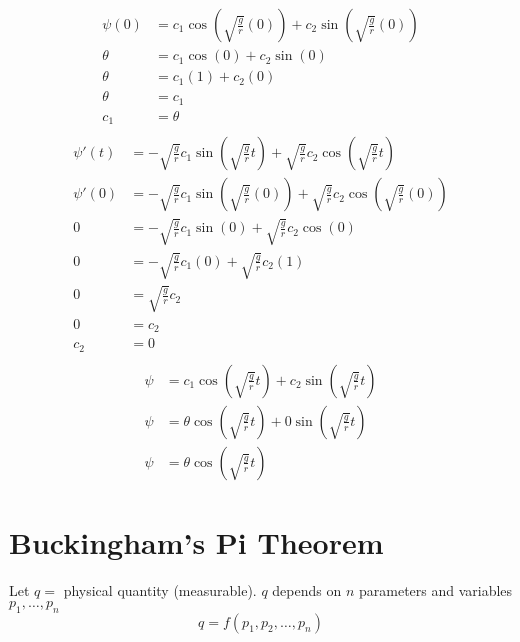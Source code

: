 \documentclass[
	date={August 26{,} 2024}
]{math486notes}
\begin{document}
\begin{example}
\begin{equation*}
\begin{aligned}
		\psi(0) &= c_{1}\cos\left( \sqrt{\frac{g}{r}}(0) \right) + c_{2}\sin\left( \sqrt{\frac{g}{r}}(0) \right)\\
		\theta &= c_{1}\cos\left( 0 \right) + c_{2}\sin\left( 0 \right)\\
		\theta &= c_{1}(1) + c_{2}(0)\\
		\theta &= c_{1}\\
		c_{1} &= \theta\\
	\end{aligned}
	\end{equation*}
	\begin{equation*}
	\begin{aligned}
		\psi'(t) &= -\sqrt{\frac{g}{r}}c_{1}\sin\left( \sqrt{\frac{g}{r}}t \right) + \sqrt{\frac{g}{r}}c_{2}\cos\left( \sqrt{\frac{g}{r}}t \right)\\
		\psi'(0) &= -\sqrt{\frac{g}{r}}c_{1}\sin\left( \sqrt{\frac{g}{r}}(0) \right) + \sqrt{\frac{g}{r}}c_{2}\cos\left( \sqrt{\frac{g}{r}}(0) \right)\\
		0 &= -\sqrt{\frac{g}{r}}c_{1}\sin(0) + \sqrt{\frac{g}{r}}c_{2}\cos(0)\\
		0 &= -\sqrt{\frac{g}{r}}c_{1}(0) + \sqrt{\frac{g}{r}}c_{2}(1)\\
		0 &= \sqrt{\frac{g}{r}}c_{2}\\
		0 &= c_{2}\\
		c_{2} &= 0\\
	\end{aligned}
	\end{equation*}
	\begin{equation*}
	\begin{aligned}
		\psi &= c_{1}\cos\left( \sqrt{\frac{g}{r}}t \right) + c_{2}\sin\left( \sqrt{\frac{g}{r}}t \right)\\
		\psi &= \theta\cos\left( \sqrt{\frac{g}{r}}t \right) + 0\sin\left( \sqrt{\frac{g}{r}}t \right)\\
		\psi &= \theta\cos\left( \sqrt{\frac{g}{r}}t \right)
	\end{aligned}
	\end{equation*} %
\end{example}

\section{Buckingham's Pi Theorem}\label{sec:buckingham's-pi-theorem}
Let $q=$ physical quantity (measurable).
$q$ depends on $n$ parameters and variables $p_{1},\dots,p_{n}$
\[ q = f(p_{1},p_{2},\dots,p_{n}) \]
\end{document}
